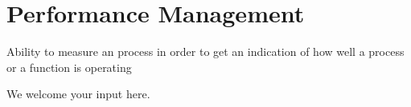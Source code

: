 \section{Performance Management}\label{sec:ekgmm-a-3-1}

Ability to measure an process in order to get an indication of how well a process or a function is operating

We welcome your input here.


